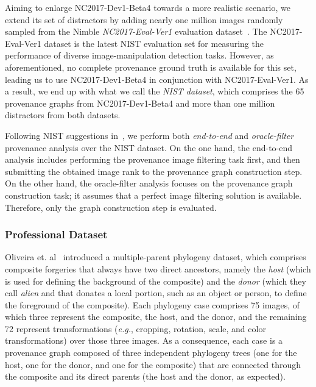 Aiming to enlarge NC2017-Dev1-Beta4 towards a more realistic scenario, we extend its set of distractors by adding %
nearly one million images randomly sampled from the Nimble \emph{NC2017-Eval-Ver1} evaluation dataset~\cite{nist2017dataset}.
The NC2017-Eval-Ver1 dataset is the latest NIST evaluation set for measuring the performance of diverse image-manipulation detection tasks.
However, as aforementioned, no complete provenance ground truth is available for this set, leading us to use NC2017-Dev1-Beta4 in conjunction with NC2017-Eval-Ver1.
As a result, we end up with what we call the \textit{NIST dataset}, which comprises the 65 provenance graphs from NC2017-Dev1-Beta4 and more than one million distractors from both datasets.

Following NIST suggestions in~\cite{nist2017dataset}, we perform both \emph{end-to-end} and \emph{oracle-filter} provenance analysis over the NIST dataset.
On the one hand, the end-to-end analysis includes performing the provenance image filtering task first, and then submitting the obtained image rank to the provenance graph construction step.
On the other hand, the oracle-filter analysis focuses on the provenance graph construction task; it assumes that a perfect image filtering solution is available.
Therefore, only the graph construction step is evaluated. %

\vspace{0.2cm}
\subsubsection{Professional Dataset}
Oliveira et. al~\cite{Oliveira_2016} introduced a multiple-parent phylogeny dataset, which comprises composite forgeries that always have two direct ancestors, namely the \emph{host} (which is used for defining the background of the composite) and the \emph{donor} (which they call \emph{alien} and that donates a local portion, such as an object or person, to define the foreground of the composite).
Each phylogeny case comprises 75 %
images, of which three represent the composite, the host, and the donor, and the remaining 72 represent transformations (\textit{e.g.}, cropping, rotation, scale, and color transformations) over those three images.
As a consequence, each case is a provenance graph composed of three independent phylogeny trees (one for the host, one for the donor, and one for the composite) that are connected through the composite and its direct parents (the host and the donor, as expected).

